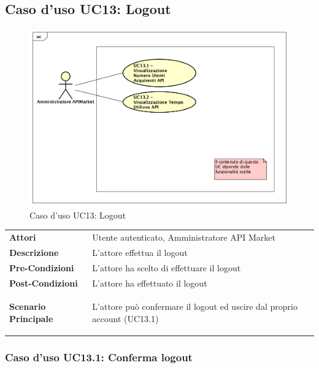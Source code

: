 \newpage
\subsection{Caso d'uso UC13: Logout}
\label{UC13}
\begin{figure}[ht]
	\centering
	\includegraphics[scale=0.45]{UML/UC13.png}
	\caption{Caso d'uso UC13: Logout}
\end{figure}

\renewcommand*{\arraystretch}{1.6}
\begin{longtable}{ l | p{11cm}}
	\hline
	\rowcolor{Gray}
	\multicolumn{2}{c}{UC13 - Logout} \\
	\hline
	\textbf{Attori} &Utente autenticato, Amministratore API Market \\
	\textbf{Descrizione} &L'attore effettua il logout \\
	\textbf{Pre-Condizioni} &L'attore ha scelto di effettuare il logout\\
	\textbf{Post-Condizioni}&L'attore ha effettuato il logout\\
	\textbf{Scenario Principale} & \begin{enumerate*}[label=(\arabic*.),itemjoin={\newline}]
		\item L'attore può confermare il logout ed uscire dal proprio account (UC13.1)
	\end{enumerate*}\\
\end{longtable}

\subsubsection{Caso d'uso UC13.1: Conferma logout}
\label{UC13_1}

